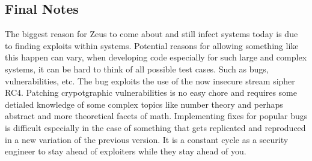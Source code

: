 \hypertarget{final-notes}{%
\subsection{Final Notes}\label{final-notes}}

The biggest reason for Zeus to come about and still infect systems today
is due to finding exploits within systems. Potential reasons for
allowing something like this happen can vary, when developing code
especially for such large and complex systems, it can be hard to think
of all possible test cases. Such as bugs, vulnerabilities, etc. The bug
exploits the use of the now insecure stream sipher RC4. Patching
crypotgraphic vulnerabilities is no easy chore and requires some
detialed knowledge of some complex topics like number theory and perhaps
abstract and more theoretical facets of math. Implementing fixes for
popular bugs is difficult especially in the case of something that gets
replicated and reproduced in a new variation of the previous version. It
is a constant cycle as a security engineer to stay ahead of exploiters
while they stay ahead of you.
